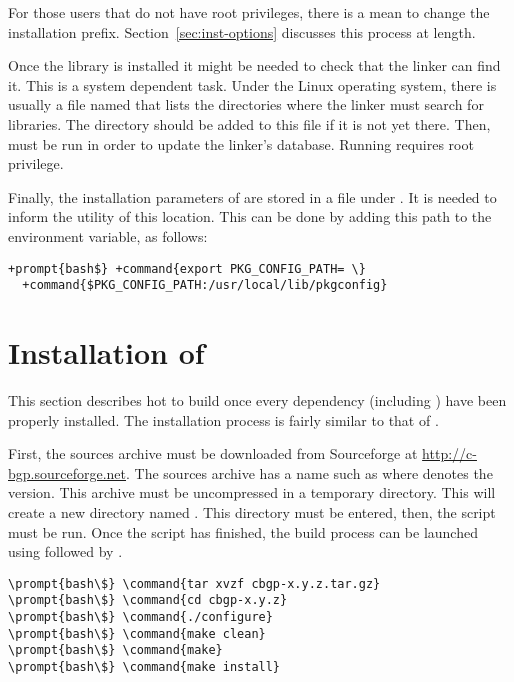 For those users that do not have root privileges, there is a mean to
change the installation prefix. Section~\ref{sec:inst-options}
discusses this process at length.

Once the library is installed it might be needed to check that the
linker can find it. This is a system dependent task. Under the Linux
operating system, there is usually a file named
 that lists the directories where the linker
must search for libraries. The directory 
should be added to this file if it is not yet there. Then,
 must be run in order to update the linker's
database. Running  requires root privilege.

Finally, the installation parameters of  are
stored in a file under . It is
needed to inform the  utility of this
location. This can be done by adding this path to the
 environment variable, as follows:

\begin{Verbatim}[commandchars=+\{\}]
+prompt{bash$} +command{export PKG_CONFIG_PATH= \}
  +command{$PKG_CONFIG_PATH:/usr/local/lib/pkgconfig}
\end{Verbatim}


\section{Installation of }

This section describes hot to build  once every
dependency (including ) have been properly
installed. The installation process is fairly similar to that of
.

First, the sources archive  must be
downloaded from Sourceforge at \url{http://c-bgp.sourceforge.net}. The
sources archive has a name such as  where
 denotes the version. This archive must be
uncompressed in a temporary directory. This will create a new
directory named . This directory must be entered,
then, the  script must be run. Once the
 script has finished, the build process can be
launched using  followed by .

\begin{Verbatim}[commandchars=\\\{\}]
\prompt{bash\$} \command{tar xvzf cbgp-x.y.z.tar.gz}
\prompt{bash\$} \command{cd cbgp-x.y.z}
\prompt{bash\$} \command{./configure}
\prompt{bash\$} \command{make clean}
\prompt{bash\$} \command{make}
\prompt{bash\$} \command{make install}
\end{Verbatim}

